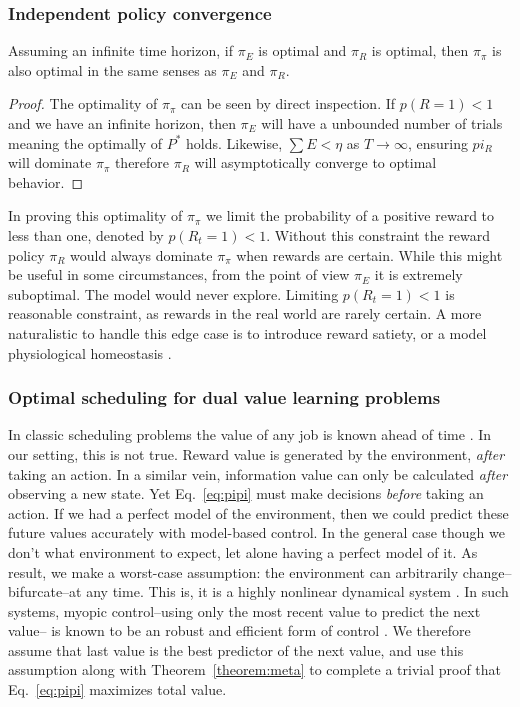 \subsubsection*{Independent policy convergence}
\begin{theorem} \label{theorem:meta} 
	Assuming an infinite time horizon, if $\pi_E$ is optimal and $\pi_R$ is optimal, then $\pi_{\pi}$ is also optimal in the same senses as $\pi_E$ and $\pi_R$. 
\end{theorem}
\begin{proof}
	The optimality of $\pi_{\pi}$ can be seen by direct inspection. If $p(R = 1) < 1$ and we have an infinite horizon, then $\pi_E$ will have a unbounded number of trials meaning the optimally of $P^*$ holds. Likewise, $\sum E < \eta$ as $T \rightarrow \infty$, ensuring $pi_R$ will dominate $\pi_{\pi}$ therefore $\pi_R$ will asymptotically converge to optimal behavior. 
\end{proof}

In proving this optimality of $\pi_{\pi}$ we limit the probability of a positive reward to less than one, denoted by $p(R_t = 1) < 1$. Without this constraint the reward policy $\pi_R$ would always dominate $\pi_{\pi}$ when rewards are certain. While this might be useful in some circumstances, from the point of view $\pi_E$ it is extremely suboptimal. The model would never explore. Limiting $p(R_t = 1) < 1$ is reasonable constraint, as rewards in the real world are rarely certain. A more naturalistic to handle this edge case is to introduce reward satiety, or a model physiological homeostasis \cite{Keramati2014,Juechems2019}.

\subsubsection*{Optimal scheduling for dual value learning problems}
In classic scheduling problems the value of any job is known ahead of time \cite{Bellmann1954,Roughgarden2019}. In our setting, this is not true. Reward value is generated by the environment, \textit{after} taking an action. In a similar vein, information value can only be calculated \textit{after} observing a new state. Yet Eq.~\ref{eq:pipi} must make decisions \textit{before} taking an action. If we had a perfect model of the environment, then we could predict these future values accurately with model-based control. In the general case though we don't what environment to expect, let alone having a perfect model of it. As result, we make a worst-case assumption: the environment can arbitrarily change--bifurcate--at any time. This is, it is a highly nonlinear dynamical system \cite{Strogatz1994}. In such systems, myopic control--using only the most recent value to predict the next value-- is known to be an robust and efficient form of control \cite{Hocker2019}. We therefore assume that last value is the best predictor of the next value, and use this assumption along with Theorem~\ref{theorem:meta} to complete a trivial proof that Eq.~\ref{eq:pipi} maximizes total value.

